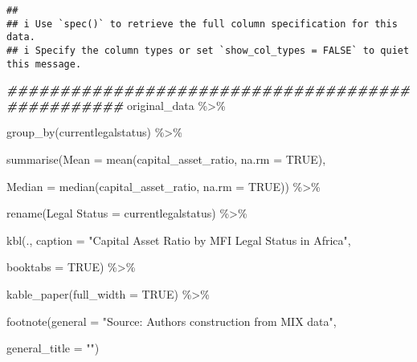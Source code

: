 \documentclass[a4paper,nobind]{templates/ociamthesis}
\newenvironment{Shaded}{\begin{snugshade}}{\end{snugshade}}
\newcommand{\AttributeTok}[1]{\textcolor[rgb]{0.77,0.63,0.00}{#1}}
\newcommand{\ConstantTok}[1]{\textcolor[rgb]{0.00,0.00,0.00}{#1}}
\newcommand{\DocumentationTok}[1]{\textcolor[rgb]{0.56,0.35,0.01}{\textbf{\textit{#1}}}}
\newcommand{\FunctionTok}[1]{\textcolor[rgb]{0.00,0.00,0.00}{#1}}
\newcommand{\NormalTok}[1]{#1}
\newcommand{\OtherTok}[1]{\textcolor[rgb]{0.56,0.35,0.01}{#1}}
\newcommand{\SpecialCharTok}[1]{\textcolor[rgb]{0.00,0.00,0.00}{#1}}
\newcommand{\StringTok}[1]{\textcolor[rgb]{0.31,0.60,0.02}{#1}}
\renewenvironment{Shaded}
{
  \vspace{10pt}%
  \begin{snugshade}%
}{%
  \end{snugshade}%
  \vspace{8pt}%
}
\begin{document}
\begin{verbatim}
## 
## i Use `spec()` to retrieve the full column specification for this data.
## i Specify the column types or set `show_col_types = FALSE` to quiet this message.
\end{verbatim}

\begin{Shaded}
\begin{Highlighting}[]
\DocumentationTok{\#\#\#\#\#\#\#\#\#\#\#\#\#\#\#\#\#\#\#\#\#\#\#\#\#\#\#\#\#\#\#\#\#\#\#\#\#\#\#\#\#\#\#\#\#\#\#\#\#}
\NormalTok{original\_data }\SpecialCharTok{\%\textgreater{}\%} 
  
  \FunctionTok{group\_by}\NormalTok{(currentlegalstatus) }\SpecialCharTok{\%\textgreater{}\%} 
  
  \FunctionTok{summarise}\NormalTok{(}\AttributeTok{Mean =} \FunctionTok{mean}\NormalTok{(capital\_asset\_ratio, }\AttributeTok{na.rm =} \ConstantTok{TRUE}\NormalTok{), }
            
            \AttributeTok{Median =} \FunctionTok{median}\NormalTok{(capital\_asset\_ratio, }\AttributeTok{na.rm =} \ConstantTok{TRUE}\NormalTok{)) }\SpecialCharTok{\%\textgreater{}\%} 
  
  \FunctionTok{rename}\NormalTok{(}\StringTok{\textasciigrave{}}\AttributeTok{Legal Status}\StringTok{\textasciigrave{}} \OtherTok{=}\NormalTok{ currentlegalstatus) }\SpecialCharTok{\%\textgreater{}\%} 
  
  \FunctionTok{kbl}\NormalTok{(., }\AttributeTok{caption =} \StringTok{"Capital Asset Ratio by MFI Legal Status in Africa"}\NormalTok{, }
      
      \AttributeTok{booktabs =} \ConstantTok{TRUE}\NormalTok{) }\SpecialCharTok{\%\textgreater{}\%} 
  
  \FunctionTok{kable\_paper}\NormalTok{(}\AttributeTok{full\_width =} \ConstantTok{TRUE}\NormalTok{) }\SpecialCharTok{\%\textgreater{}\%} 
  
  \FunctionTok{footnote}\NormalTok{(}\AttributeTok{general =} \StringTok{"Source: Authors\textquotesingle{} construction from MIX data"}\NormalTok{,}
           
           \AttributeTok{general\_title =} \StringTok{""}\NormalTok{)}
\end{Highlighting}
\end{Shaded}
\end{document}

